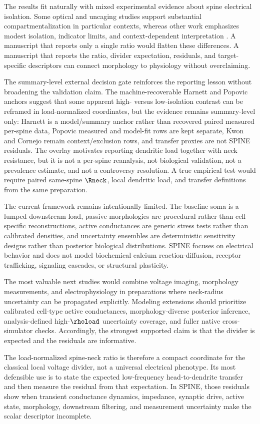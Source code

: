 The results fit naturally with mixed experimental evidence about spine electrical isolation. Some optical and uncaging studies support substantial compartmentalization in particular contexts, whereas other work emphasizes modest isolation, indicator limits, and context-dependent interpretation \citep{Araya2006,Kwon2017,Cornejo2022,Popovic2015,Zecevic2023}. A manuscript that reports only a single ratio would flatten these differences. A manuscript that reports the ratio, divider expectation, residuals, and target-specific descriptors can connect morphology to physiology without overclaiming.

The summary-level external decision gate reinforces the reporting lesson without broadening the validation claim. The machine-recoverable Harnett and Popovic anchors suggest that some apparent high- versus low-isolation contrast can be reframed in load-normalized coordinates, but the evidence remains summary-level only: Harnett is a model/summary anchor rather than recovered paired measured per-spine data, Popovic measured and model-fit rows are kept separate, Kwon and Cornejo remain context/exclusion rows, and transfer proxies are not SPINE residuals. The overlay motivates reporting dendritic load together with neck resistance, but it is not a per-spine reanalysis, not biological validation, not a prevalence estimate, and not a controversy resolution. A true empirical test would require paired same-spine $\Rneck$, local dendritic load, and transfer definitions from the same preparation.

The current framework remains intentionally limited. The baseline soma is a lumped downstream load, passive morphologies are procedural rather than cell-specific reconstructions, active conductances are generic stress tests rather than calibrated densities, and uncertainty ensembles are deterministic sensitivity designs rather than posterior biological distributions. SPINE focuses on electrical behavior and does not model biochemical calcium reaction-diffusion, receptor trafficking, signaling cascades, or structural plasticity.

The most valuable next studies would combine voltage imaging, morphology measurements, and electrophysiology in preparations where neck-radius uncertainty can be propagated explicitly. Modeling extensions should prioritize calibrated cell-type active conductances, morphology-diverse posterior inference, analysis-defined high-$\rhoload$ uncertainty coverage, and fuller native cross-simulator checks. Accordingly, the strongest supported claim is that the divider is expected and the residuals are informative.

The load-normalized spine-neck ratio is therefore a compact coordinate for the classical local voltage divider, not a universal electrical phenotype. Its most defensible use is to state the expected low-frequency head-to-dendrite transfer and then measure the residual from that expectation. In SPINE, those residuals show when transient conductance dynamics, impedance, synaptic drive, active state, morphology, downstream filtering, and measurement uncertainty make the scalar descriptor incomplete.
